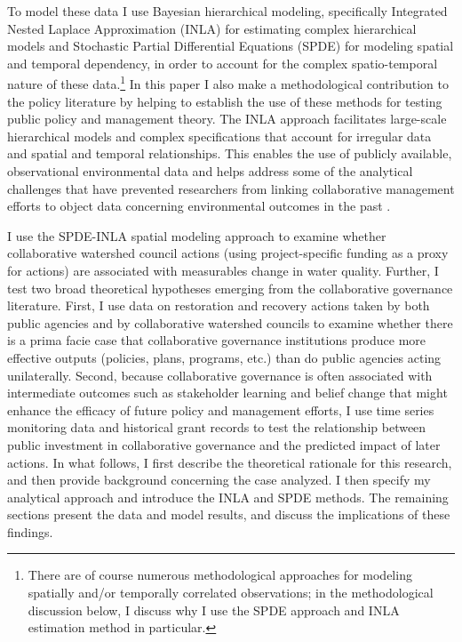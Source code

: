 \documentclass[12pt,a4paper,titlepage]{article}
\begin{document}
To model these data I use Bayesian hierarchical modeling, specifically Integrated Nested Laplace Approximation (INLA) \parencite{rue2009} for estimating complex hierarchical models and Stochastic Partial Differential Equations (SPDE) \parencite{lindgren2011} for modeling spatial and temporal dependency, in order to account for the complex spatio-temporal nature of these data.\footnote{There are of course numerous methodological approaches for modeling spatially and/or temporally correlated observations; in the methodological discussion below, I discuss why I use the SPDE approach and INLA estimation method in particular.} In this paper I also make a methodological contribution to the policy literature by helping to establish the use of these methods for testing public policy and management theory. The INLA approach facilitates large-scale hierarchical models and complex specifications that account for irregular data and spatial and temporal relationships. This enables the use of publicly available, observational environmental data and helps address some of the analytical challenges that have prevented researchers from linking collaborative management efforts to object data concerning environmental outcomes in the past \parencite{koontz2006,thomas2011}.

I use the SPDE-INLA spatial modeling approach to examine whether collaborative watershed council actions (using project-specific funding as a proxy for actions) are associated with measurables change in water quality. Further, I test two broad theoretical hypotheses emerging from the collaborative governance literature. First, I use data on restoration and recovery actions taken by both public agencies and by collaborative watershed councils to examine whether there is a prima facie case that collaborative governance institutions produce more effective outputs (policies, plans, programs, etc.) than do public agencies acting unilaterally. Second, because collaborative governance is often associated with intermediate outcomes such as stakeholder learning and belief change that might enhance the efficacy of future policy and management efforts, I use time series monitoring data and historical grant records to test the relationship between public investment in collaborative governance and the predicted impact of later actions. In what follows, I first describe the theoretical rationale for this research, and then provide background concerning the case analyzed. I then specify my analytical approach and introduce the INLA and SPDE methods. The remaining sections present the data and model results, and discuss the implications of these findings.
\end{document}

